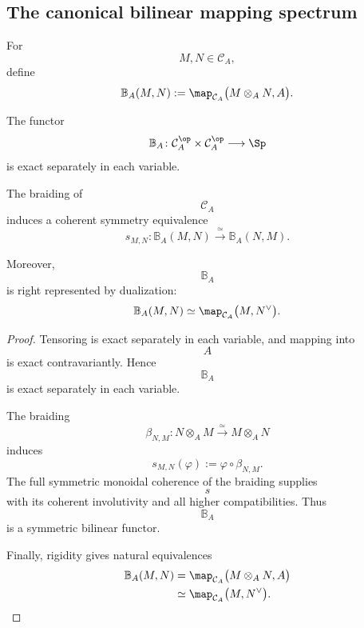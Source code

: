 \subsection{The canonical bilinear mapping spectrum}

\begin{definition}
\label{def:canonical-perfect-bilinear-functor}
For
\[
    M,N\in\mathcal C_A,
\]
define
\[
    \mathbb B_A(M,N)
    :=
    \map_{\mathcal C_A}
    \bigl(
        M\otimes_A N,
        A
    \bigr).
\]
\end{definition}

\begin{proposition}
\label{prop:canonical-bilinear-symmetry-representability}
The functor
\[
    \mathbb B_A
    \colon
    \mathcal C_A^{\op}
    \times
    \mathcal C_A^{\op}
    \longrightarrow
    \Sp
\]
is exact separately in each variable.

The braiding of
\[
    \mathcal C_A
\]
induces a coherent symmetry equivalence
\[
    s_{M,N}
    \colon
    \mathbb B_A(M,N)
    \xrightarrow{\;\simeq\;}
    \mathbb B_A(N,M).
\]

Moreover,
\[
    \mathbb B_A
\]
is right represented by dualization:
\[
    \mathbb B_A(M,N)
    \simeq
    \map_{\mathcal C_A}
    \bigl(
        M,
        N^\vee
    \bigr).
\]
\end{proposition}

\begin{proof}
Tensoring is exact separately in each variable, and mapping into
\[
    A
\]
is exact contravariantly. Hence
\[
    \mathbb B_A
\]
is exact separately in each variable.

The braiding
\[
    \beta_{N,M}
    \colon
    N\otimes_A M
    \xrightarrow{\;\simeq\;}
    M\otimes_A N
\]
induces
\[
    s_{M,N}(\varphi)
    :=
    \varphi\circ\beta_{N,M}.
\]
The full symmetric monoidal coherence of the braiding supplies
\[
    s
\]
with its coherent involutivity and all higher compatibilities. Thus
\[
    \mathbb B_A
\]
is a symmetric bilinear functor.

Finally, rigidity gives natural equivalences
\[
\begin{aligned}
    \mathbb B_A(M,N)
    &=
    \map_{\mathcal C_A}
    \bigl(
        M\otimes_A N,
        A
    \bigr)
    \\
    &\simeq
    \map_{\mathcal C_A}
    \bigl(
        M,
        N^\vee
    \bigr).
\end{aligned}
\]
\end{proof}


